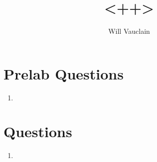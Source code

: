 \documentclass{article}
\title{<++>}
\author{Will Vauclain}
\begin{document}
\maketitle

\section*{Prelab Questions}

\begin{enumerate}[\bf Q1.]
    \item <++>
\end{enumerate}

\section*{Questions}

\begin{enumerate}[\bf Q1.]
    \item <++>
\end{enumerate}
\end{document}
